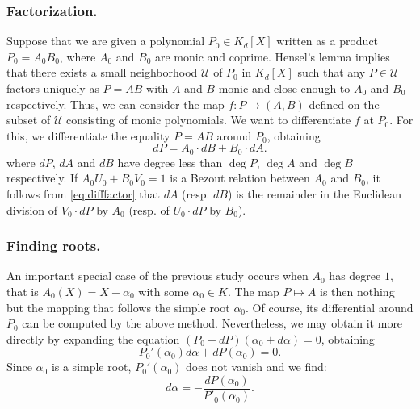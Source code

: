 \documentclass{lms}
\begin{document}
\subsubsection*{Factorization.}

Suppose that we are given a polynomial $P_0 \in K_d[X]$ written as a 
product $P_0 = A_0 B_0$, where $A_0$ and $B_0$ are monic and coprime. 
Hensel's lemma implies that there exists a small neighborhood $\mathcal 
U$ of $P_0$ in $K_d[X]$ such that any $P \in \mathcal U$ factors 
uniquely as $P = A B$ with $A$ and $B$ monic and close enough to $A_0$ 
and $B_0$ respectively. Thus, we can consider the map $f : P 
\mapsto (A,B)$ defined on the subset of $\mathcal U$ consisting of monic 
polynomials. We want to differentiate $f$ at $P_0$. For this, we 
differentiate the equality $P = A B$ around $P_0$, obtaining
\begin{equation}
\label{eq:difffactor}
dP = A_0 \cdot dB + B_0 \cdot dA.
\end{equation}
where $dP$, $dA$ and $dB$ have degree less than $\deg P$, $\deg A$ and 
$\deg B$ respectively. If $A_0 U_0 + B_0 V_0 = 1$ is a Bezout relation
between $A_0$ and $B_0$, it follows from \eqref{eq:difffactor} that
$dA$ (resp. $dB$) is the remainder in the Euclidean division of $V_0
{\cdot} dP$ by $A_0$ (resp. of $U_0 {\cdot} dP$ by $B_0$).

\subsubsection*{Finding roots.}

An important special case of the previous study occurs when $A_0$ has 
degree $1$, that is $A_0(X) = X - \alpha_0$ with some $\alpha_0 \in K$. 
The map $P \mapsto A$ is then nothing but the mapping that 
follows the simple root $\alpha_0$. Of course, its differential around 
$P_0$ can be computed by the above method. Nevertheless, we may
obtain it more directly by expanding the equation $(P_0 + 
dP)(\alpha_0 + d\alpha) = 0$, obtaining
\[
P_0'(\alpha_0) d\alpha + dP(\alpha_0) = 0.
\]
Since $\alpha_0$ is a simple root, $P_0'(\alpha_0)$ 
does not vanish and we find:
$$d \alpha = - \frac{dP(\alpha_0)}{P'_0(\alpha_0)}.$$
\end{document}
